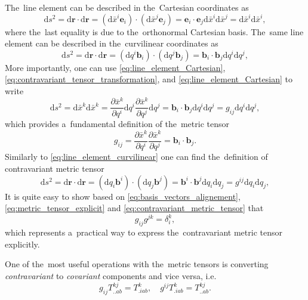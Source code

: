 \documentclass[review]{elsarticle}
\newcommand{\pdv}[2]{\frac{\partial{#1}}{\partial{#2}}}
\newcommand{\vect}[1]{\boldsymbol{#1}}
\newcommand{\dI}{\text{d}}
\begin{document}
The~line element can be described in the~Cartesian coordinates as
\begin{equation}
  \dI s^2 = \dI\vect{r}\cdot\dI\vect{r} = 
  (\dI \bar{x}^i \vect{e}_i)\cdot(\dI \bar{x}^j \vect{e}_j) = 
  \vect{e}_i\cdot\vect{e}_j \dI \bar{x}^i \dI \bar{x}^j 
  = \dI \bar{x}^i \dI \bar{x}^i ,
  \label{eq:line_element_Cartesian}
\end{equation}
where the~last equality is due to the~orthonormal Cartesian basis.
The~same line element can be described in the~curvilinear coordinates as
\begin{equation}
  \dI s^2 = \dI\vect{r}\cdot\dI\vect{r} = 
  (\dI q^i \vect{b}_i)\cdot(\dI q^j \vect{b}_j) = 
  \vect{b}_i\cdot\vect{b}_j \dI q^i \dI q^j ,
  \label{eq:line_element_curvilinear}
\end{equation}
More importantly, one can use \eqref{eq:line_element_Cartesian},
\eqref{eq:contravariant_tensor_transformation}, and 
\eqref{eq:line_element_Cartesian} to write
\begin{equation}
  \dI s^2 = \dI \bar{x}^k \dI \bar{x}^k = 
  \pdv{\bar{x}^k}{q^i} \dI q^{i} \pdv{\bar{x}^k}{q^j} \dI q^{j} 
  = \vect{b}_i\cdot\vect{b}_j \dI q^i \dI q^j 
  = g_{ij} \dI q^i \dI q^j ,
  \label{eq:metric_tensor}
\end{equation}
which provides a~fundamental definition of the~metric tensor
\begin{equation}
  g_{ij} = \pdv{\bar{x}^k}{q^i}\pdv{\bar{x}^k}{q^j} 
  = \vect{b}_i\cdot\vect{b}_j .
  \label{eq:metric_tensor_explicit}
\end{equation}
Similarly to \eqref{eq:line_element_curvilinear}
one can find the~definition of contravariant metric tensor
\begin{equation}
  \dI s^2 = \dI\vect{r}\cdot\dI\vect{r} = 
  (\dI q_i \vect{b}^i)\cdot(\dI q_j \vect{b}^j) = 
  \vect{b}^i\cdot\vect{b}^j \dI q_i \dI q_j 
  = g^{ij}\dI q_i \dI q_j ,
  \label{eq:contravariant_metric_tensor}
\end{equation}
It is quite easy to show 
based on \eqref{eq:basis_vectors_alignement}, 
\eqref{eq:metric_tensor_explicit} and \eqref{eq:contravariant_metric_tensor}
that
\begin{equation}
  g_{ij} g^{jk} = \delta_i^k ,
  \label{eq:contravariant_metric_tensor_explicit}
\end{equation}
which represents a~practical way to express the~contravariant metric tensor 
explicitly.

One of the~most useful operations with the~metric tensors is converting 
\textit{contravariant} to \textit{covariant} components and vice versa, i.e.
\begin{equation}
  g_{ij} T^{kj}_{..ab} = T^k_{.iab},\quad g^{ij} T^k_{.iab} = T^{kj}_{..ab} .
  \label{eq:contravariant2covariant}
\end{equation}
\end{document}
